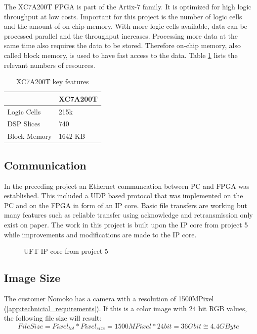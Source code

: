 The XC7A200T FPGA is part of the Artix-7 family. It is optimized for high logic
throughput at low costs. Important for this project is the number of logic cells
and the amount of on-chip memory. With more logic cells available, data can be
processed parallel and the throughput increases. Processing more data at the
same time also requires the data to be stored. Therefore on-chip memory, also
called block memory, is used to have fast access to the data. Table 
\ref{tab:XC7A200T} lists the relevant numbers of resources.

\begin{table}[tb!]
    \centering
    \begin{tabular}{l l}
        \toprule
         & XC7A200T \\
        \midrule
        Logic Cells & 215k \\
        DSP Slices & 740 \\
        Block Memory & 1642 KB \\
        \bottomrule
    \end{tabular}
    \caption{XC7A200T key features \cite{xilinx_ac701}}
    \label{tab:XC7A200T}
\end{table}


\subsection{Communication} \label{chapt:mission:communication} 
In the preceding project \cite{p5report} an Ethernet communcation between PC and
FPGA was established. This included a UDP based protocol that was implemented on
the PC and on the FPGA in form of an IP core. Basic file transfers are working
but many features such as reliable transfer using acknowledge and retransmission
only exist on paper. The work in this project is built
upon the IP core from project 5 while improvements and modifications are made to
the IP core.

\begin{figure}[tb!]
    \centering
    \caption{UFT IP core from project 5 \cite{p5report}}
    \label{fig:uftipcorep5}
\end{figure}


\subsection{Image Size}
The customer Nomoko has a camera with a resolution of 1500MPixel (\ref{app:technicial_requirements}). If this is a color image with 24 bit RGB values, the following file size will result:
\begin{equation}
    File Size = Pixel_{tot} * Pixel_{size} = 1500MPixel * 24bit = 36Gbit \cong 4.4GByte
    \label{eq:filesize}
\end{equation}

